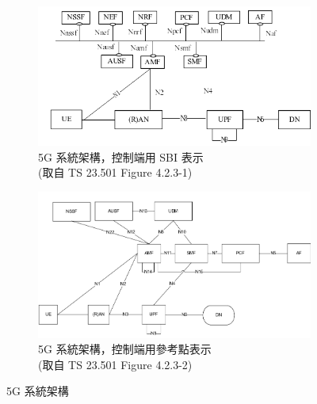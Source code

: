 \begin{figure}[ht]
    \centering
    \captionsetup{justification=centering}
    \begin{subfigure}[b]{.5\linewidth}
        \centering
        \includegraphics[height=!,width=0.95\linewidth,keepaspectratio=true]{figures/23_501_4-2-3-1_sys_arch_sbi}
        \caption[5G 系統架構，控制端用 SBI 表示]{{5G 系統架構，控制端用 SBI 表示\\\scriptsize (取自 TS 23.501 Figure 4.2.3-1)}}
        \label{fig:5g_system_architecture_sbi}
    \end{subfigure}%
    \begin{subfigure}[b]{.5\linewidth}
        \centering
        \includegraphics[height=!,width=0.95\linewidth,keepaspectratio=true]{figures/23_501_4-2-3-2_sys_arch_ref}
        \caption[5G 系統架構，控制端用參考點表示]{{5G 系統架構，控制端用參考點表示\\\scriptsize (取自 TS 23.501 Figure 4.2.3-2)}}
        \label{fig:5g_system_architecture_interface}
    \end{subfigure}
    \caption[5G 系統架構]{{\footnotesize 5G 系統架構~\cite{3gpp.23.501}}}
    \label{fig:5g_system_architecture}
\end{figure}

